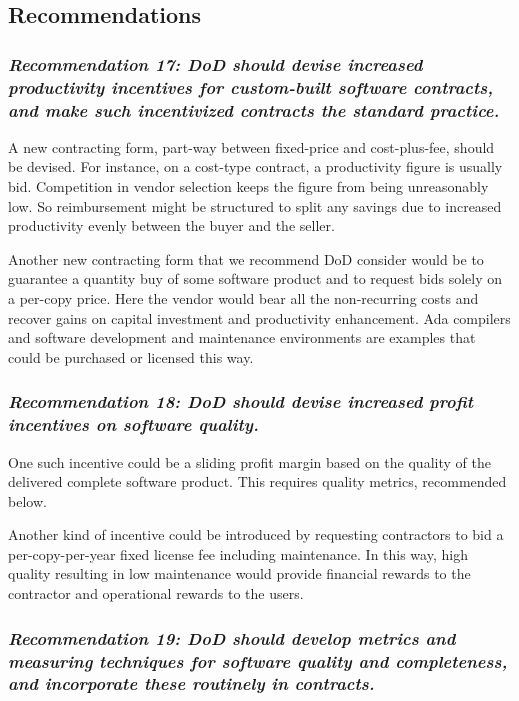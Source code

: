 \documentclass[11pt,final]{article}
\begin{document}
\subsection*{Recommendations}

\label{rec:17}
\subsubsection*{\textit{Recommendation 17: DoD should devise increased productivity incentives
for custom-built software contracts, and make such incentivized contracts the
standard practice.}}

A new contracting form, part-way between fixed-price and cost-plus-fee, should
be devised. For instance, on a cost-type contract, a productivity figure is
usually bid.  Competition in vendor selection keeps the figure from being
unreasonably low. So reimbursement might be structured to split any savings due
to increased productivity evenly between the buyer and the seller.

Another new contracting form that we recommend DoD consider would be to
guarantee a quantity buy of some software product and to request bids solely on
a per-copy price. Here the vendor would bear all the non-recurring costs and
recover gains on capital investment and productivity enhancement. Ada compilers
and software development and maintenance environments are examples that could
be purchased or licensed this way.

\label{rec:18}
\subsubsection*{\textit{Recommendation 18: DoD should devise increased profit incentives on
software quality.}}

One such incentive could be a sliding profit margin based on the quality of the
delivered complete software product. This requires quality metrics, recommended
below.

Another kind of incentive could be introduced by requesting contractors to bid
a per-copy-per-year fixed license fee including maintenance. In this way, high
quality resulting in low maintenance would provide financial rewards to the
contractor and operational rewards to the users.

\label{rec:19}
\subsubsection*{\textit{Recommendation 19: DoD should develop metrics and
measuring techniques for software quality and completeness, and incorporate
these routinely in contracts.}}
\end{document}
